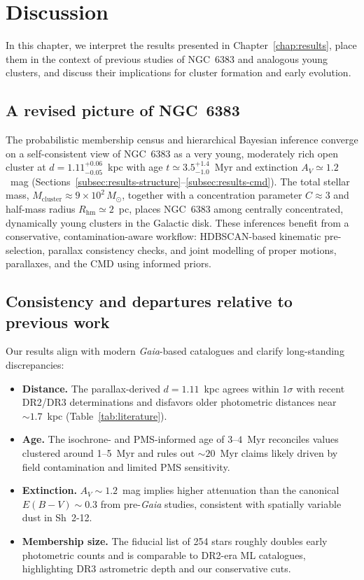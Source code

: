 \documentclass[../main.tex]{subfiles}
\begin{document}
\section{Discussion}
\label{sec:discussion-overview}

In this chapter, we interpret the results presented in Chapter~\ref{chap:results}, place them in the context of previous studies of NGC~6383 and analogous young clusters, and discuss their implications for cluster formation and early evolution.

\subsection{A revised picture of NGC~6383}
\label{subsec:discussion-summary}

The probabilistic membership census and hierarchical Bayesian inference converge on a self-consistent view of NGC~6383 as a very young, moderately rich open cluster at $d=1.11^{+0.06}_{-0.05}$~kpc with age $t\simeq3.5^{+1.4}_{-1.0}$~Myr and extinction $A_V\simeq1.2$~mag (Sections~\ref{subsec:results-structure}--\ref{subsec:results-cmd}). The total stellar mass, $M_{\text{cluster}}\approx9\times10^2\,M_\odot$, together with a concentration parameter $C\approx3$ and half-mass radius $R_{\text{hm}}\simeq2$~pc, places NGC~6383 among centrally concentrated, dynamically young clusters in the Galactic disk. These inferences benefit from a conservative, contamination-aware workflow: HDBSCAN-based kinematic pre-selection, parallax consistency checks, and joint modelling of proper motions, parallaxes, and the CMD using informed priors.

\subsection{Consistency and departures relative to previous work}
\label{subsec:discussion-literature}

Our results align with modern \textit{Gaia}-based catalogues and clarify long-standing discrepancies:

\begin{itemize}
  \item \textbf{Distance.} The parallax-derived $d=1.11$~kpc agrees within $1\sigma$ with recent DR2/DR3 determinations and disfavors older photometric distances near $\sim1.7$~kpc (Table~\ref{tab:literature}).
  \item \textbf{Age.} The isochrone- and PMS-informed age of $3$--$4$~Myr reconciles values clustered around 1--5~Myr and rules out $\sim20$~Myr claims likely driven by field contamination and limited PMS sensitivity.
  \item \textbf{Extinction.} $A_V\!\sim\!1.2$~mag implies higher attenuation than the canonical $E(B\!-\!V)\!\sim\!0.3$ from pre-\textit{Gaia} studies, consistent with spatially variable dust in Sh~2-12.
  \item \textbf{Membership size.} The fiducial list of 254 stars roughly doubles early photometric counts and is comparable to DR2-era ML catalogues, highlighting DR3 astrometric depth and our conservative cuts.
\end{itemize}
\end{document}
